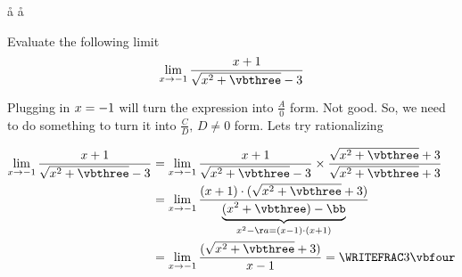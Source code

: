 



\SQUARE\vbone\aa
\SQUARE\vbtwo\bb
\SUBTRACT\bb\aa\vbthree

\MULTIPLY{}\vbfour

\question[4] Evaluate the following limit \[ \lim_{x\to -\vbone}\dfrac{x + \vbone}{\sqrt{x^2 + \vbthree} - \vbtwo} \] 

\watchout


\begin{solution}[\halfpage]
  Plugging in $x = -1$ will turn the expression into $\frac{A}{0}$ form. Not good. So, we need to 
  do something to turn it into $\frac{C}{D},\, D\neq 0$ form. Lets try rationalizing 

  \begin{align}
    \lim_{x\to -\vbone}\dfrac{x + \vbone}{\sqrt{x^2 + \vbthree} - \vbtwo} &= 
    \lim_{x\to -\vbone}\dfrac{x + \vbone}{\sqrt{x^2 + \vbthree} - \vbtwo}\times\dfrac{\sqrt{x^2 + \vbthree} + \vbtwo}{\sqrt{x^2 + \vbthree} + \vbtwo}  \\
    &= \lim_{x\to -\vbone}\dfrac{(x + \vbone)\cdot(\sqrt{x^2 + \vbthree} + \vbtwo)}
    {\underbrace{(x^2 + \vbthree) - \bb}_{x^2-\aa = (x-\vbone)\cdot(x+\vbone)}} \\
    &= \lim_{x\to -\vbone}\dfrac{(\sqrt{x^2 + \vbthree} + \vbtwo)}{x-\vbone} = \WRITEFRAC\vbtwo\vbfour
  \end{align}
\end{solution}


